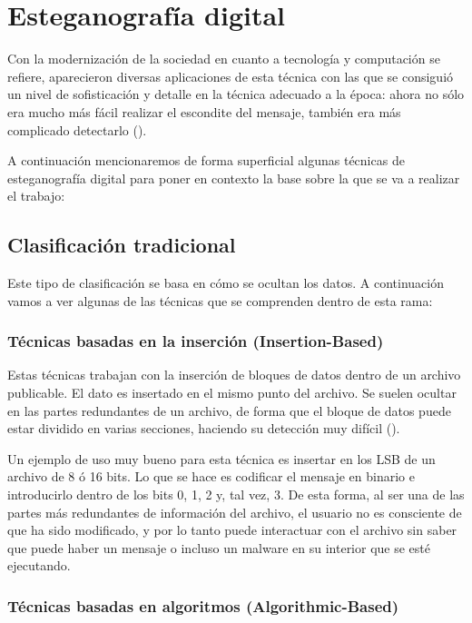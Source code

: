 \section{Esteganografía digital}

Con la modernización de la sociedad en cuanto a tecnología y computación se refiere, aparecieron diversas aplicaciones de esta técnica con las que se consiguió un nivel de sofisticación y detalle en la técnica adecuado a la época: ahora no sólo era mucho más fácil realizar el escondite del mensaje, también era más complicado detectarlo (\cite{esteganografia-digital}). %

A continuación mencionaremos de forma superficial algunas técnicas de esteganografía digital para poner en contexto la base sobre la que se va a realizar el trabajo:

\subsection{Clasificación tradicional}
\label{sec:trad}

Este tipo de clasificación se basa en cómo se ocultan los datos. A continuación vamos a ver algunas de las técnicas que se comprenden dentro de esta rama:

\subsubsection{Técnicas basadas en la inserción (Insertion-Based)}

Estas técnicas trabajan con la inserción de bloques de datos dentro de un archivo publicable. El dato es insertado en el mismo punto del archivo. Se suelen ocultar en las partes redundantes de un archivo, de forma que el bloque de datos puede estar dividido en varias secciones, haciendo su detección muy difícil (\cite{esteganografia-digital}).%

Un ejemplo de uso muy bueno para esta técnica es insertar en los \ac{LSB} de un archivo de 8 ó 16 bits. Lo que se hace es codificar el mensaje en binario e introducirlo dentro de los bits 0, 1, 2 y, tal vez, 3. De esta forma, al ser una de las partes más redundantes de información del archivo, el usuario no es consciente de que ha sido modificado, y por lo tanto puede interactuar con el archivo sin saber que puede haber un mensaje o incluso un malware en su interior que se esté ejecutando.

\subsubsection{Técnicas basadas en algoritmos (Algorithmic-Based)} 

